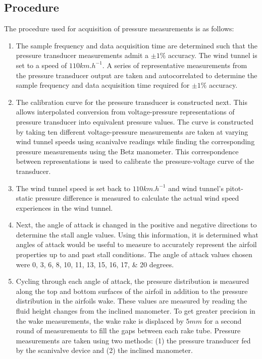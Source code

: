 \documentclass[runningheads]{llncs}
\begin{document}
\subsection{Procedure}\label{sec:procedure}


\noindent
The procedure used for acquisition of pressure measurements is as follows:

\begin{enumerate}

    \item The sample frequency and data acquisition time are determined such that the pressure transducer measurements admit a $\pm 1\%$ accuracy. The wind tunnel is set to a speed of $110\si{km.h^{-1}}$. A series of representative measurements from the pressure transducer output are taken and autocorrelated to determine the sample frequency and data acquisition time required for $\pm 1\%$ accuracy.
    
    \item The calibration curve for the pressure transducer is constructed next. This allows interpolated conversion from voltage-pressure representations of pressure transducer into equivalent pressure values. The curve is constructed by taking ten different voltage-pressure measurements are taken at varying wind tunnel speeds using scanivalve readings while finding the corresponding pressure measurements using the Betz manometer. This correspondence between representations is used to calibrate the pressure-voltage curve of the transducer.
    
    \item The wind tunnel speed is set back to $110\si{km.h^{-1}}$ and wind tunnel's pitot-static pressure difference is measured to calculate the actual wind speed experiences in the wind tunnel.
    
    \item Next, the angle of attack is changed in the positive and negative directions to determine the stall angle values. Using this information, it is determined what angles of attack would be useful to measure to accurately represent the airfoil properties up to and past stall conditions. The angle of attack values chosen were \numlist{0;3;6;8;10;11;13;15;16;17;20} degrees.

    \item Cycling through each angle of attack, the pressure distribution is measured along the top and bottom surfaces of the airfoil in addition to the pressure distribution in the airfoils wake. These values are measured by reading the fluid height changes from the inclined manometer. To get greater precision in the wake measurements, the wake rake is displaced by $5\si{mm}$ for a second round of measurements to fill the gaps between each rake tube. Pressure measurements are taken using two methods: (1) the pressure transducer fed by the scanivalve device and (2) the inclined manometer.

\end{enumerate}
\end{document}

